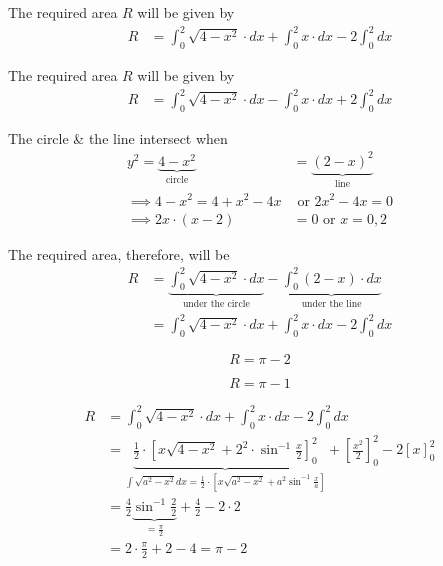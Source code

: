 \documentclass[14pt,fleqn]{extarticle}
\begin{document}
The required area $R$ will be given by 
\begin{align}
R &= \int_0^2 \sqrt{4-x^2}\cdot dx + \int_0^2 x\cdot dx - 2\int_0^2 dx
\end{align} 

\newcard

The required area $R$ will be given by 
\begin{align}
R &= \int_0^2 \sqrt{4-x^2}\cdot dx - \int_0^2 x\cdot dx + 2\int_0^2 dx
\end{align}

\newcard

The circle \& the line intersect when 
%
\begin{align}
y^2 = \underbrace{4-x^2}_{\text{circle}} &= \underbrace{(2-x)^2}_{\text{line}}\\
\implies 4-x^2 = 4 + x^2 - 4x & \text{ or }  2x^2-4x = 0 \\
\implies 2x\cdot(x-2) &= 0 \text{ or } x = 0,2 
\end{align} 

The required area, therefore, will be 
%
\begin{align}
R &= \underbrace{\int_0^2 \sqrt{4-x^2}\cdot dx}_{\text{under the circle}} 
- \underbrace{\int_0^2 (2-x)\cdot dx}_{\text{under the line}} \\
&= \int_0^2 \sqrt{4-x^2}\cdot dx + \int_0^2 x\cdot dx - 2\int_0^2 dx
\end{align}

\newcard

\[ R = \pi - 2\] 

\newcard

\[ R = \pi - 1\] 

\newcard

%
\begin{align}
R &= \int_0^2 \sqrt{4-x^2}\cdot dx + \int_0^2 x\cdot dx - 2\int_0^2 dx\\
&= \underbrace{\frac{1}{2}\cdot\left[ x\sqrt{4-x^2}+2^2\cdot\sin^{-1}\frac{x}{2}\right]_0^2}
_{\int\sqrt{a^2-x^2}dx = \frac{1}{2}\cdot\left[x\sqrt{a^2-x^2}+a^2\sin^{-1}\frac{x}{a}\right]}+\left[\frac{x^2}{2}\right]_0^2 - 2\left[ x\right]_0^2 \\
&= \frac{4}{2}\underbrace{\sin^{-1}\frac{2}{2}}_{=\frac\pi{2}} + \frac{4}{2} - 2\cdot 2 \\
&= 2\cdot\frac\pi{2} + 2 - 4 = \pi - 2
\end{align}
\end{document}

